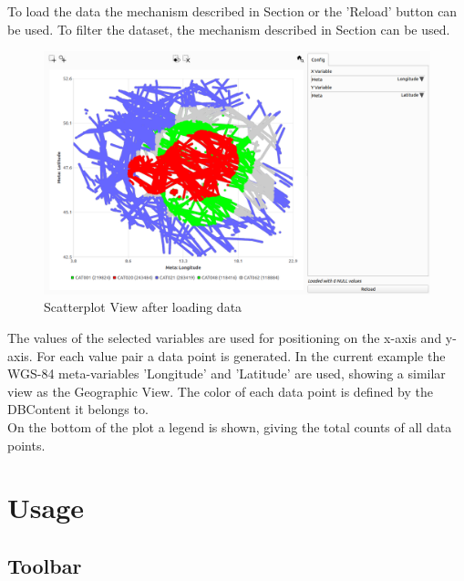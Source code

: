 To load the data the mechanism described in Section  or the 'Reload' button can be used. To filter the dataset, the mechanism described in Section  can be used. \\

\begin{figure}[H]
    \hspace*{-2cm}
    \includegraphics[width=18cm,frame]{figures/scatter_loaded.png}
  \caption{Scatterplot View after loading data}
\end{figure}

The values of the selected variables are used for positioning on the x-axis and y-axis. For each value pair a data point is generated. 
In the current example the WGS-84 meta-variables 'Longitude' and 'Latitude' are used, showing a similar view as the Geographic View.
The color of each data point is defined by the DBContent it belongs to.\\


On the bottom of the plot a legend is shown, giving the total counts of all data points.

\section{Usage}

\subsection{Toolbar}

